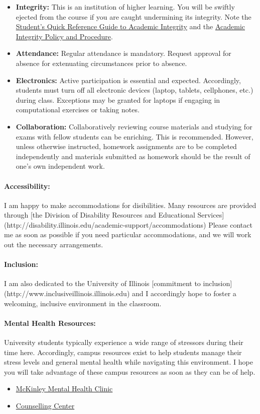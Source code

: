 \documentclass[11pt, a4paper]{article}
\begin{document}
\begin{itemize}
\item[] \textbf{Integrity:} This is an institution of higher
learning. You will be swiftly ejected from the course if you are caught
undermining its integrity. Note the
\href{http://www.provost.illinois.edu/academicintegrity/students.html}{Student's
Quick Reference Guide to Academic Integrity} and the
\href{http://studentcode.illinois.edu/article1_part4_1-401.html}{Academic
Integrity Policy and Procedure}.  
\item[] \textbf{Attendance:} Regular attendance is mandatory. Request approval for absence for extenuating circumstances prior to absence.
\item[] \textbf{Electronics:} Active participation is essential and expected. 
        Accordingly, students must turn off all electronic devices (laptop, 
        tablets, cellphones, etc.) during class. Exceptions may be granted for 
        laptops if engaging in computational exercises or taking notes. 
\item[] \textbf{Collaboration:} Collaboratively reviewing course materials and studying for exams with fellow students can be enriching.  This is recommended.  However, unless otherwise instructed, homework assignments are to be completed independently and materials submitted as homework should be the result of one's own independent work.
\end{itemize}

\paragraph{Accessibility:} I am happy to make accommodations for disibilities.
Many resources are provided through [the Division of Disability Resources and
Educational Services](http://disability.illinois.edu/academic-support/accommodations)
Please contact me as soon as possible if you need particular accommodations,
and we will work out the necessary arrangements.

\paragraph{Inclusion:} I am also dedicated to the University of Illinois 
[commitment to inclusion](http://www.inclusiveillinois.illinois.edu) and I 
accordingly hope to foster a welcoming, inclusive environment in the classroom.

\paragraph{Mental Health Resources:} 
University students typically experience a wide range of stressors during their time here. Accordingly, campus resources exist to help students manage their stress levels and general mental health while navigating this environment. I hope you will take advantage of these campus resources as soon as they can be of help.

\begin{itemize}
\item \href{http://www.mckinley.illinois.edu/clinics/mental\_health.htm}{McKinley Mental Health Clinic}
\item \href{http://counselingcenter.illinois.edu/}{Counselling Center}
\end{itemize}
\end{document}
